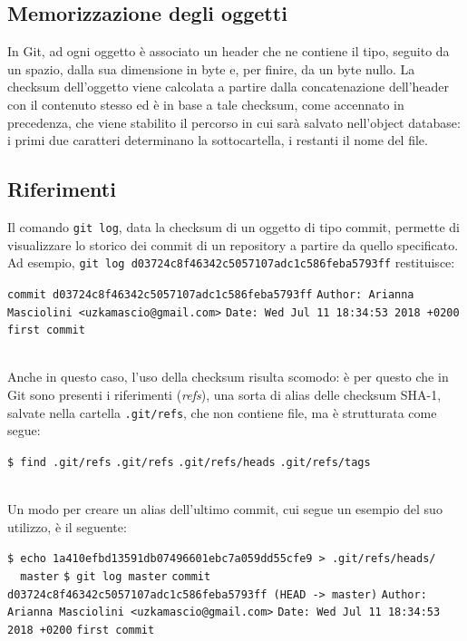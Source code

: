 \documentclass[12pt]{article}
\def\code#1{\texttt{#1}}
\begin{document}
\subsection{Memorizzazione degli oggetti}
In Git, ad ogni oggetto è associato un header che ne contiene il tipo, seguito da un spazio, dalla sua dimensione in byte e, per finire, da un byte nullo. La checksum dell'oggetto viene calcolata a partire dalla concatenazione dell'header con il contenuto stesso ed è in base a tale checksum, come accennato in precedenza, che viene stabilito il percorso in cui sarà salvato nell'object database: i primi due caratteri determinano la sottocartella, i restanti il nome del file.
\subsection{Riferimenti}
Il comando \code{git log}, data la checksum di un oggetto di tipo commit, permette di visualizzare lo storico dei commit di un repository a partire da quello specificato. Ad esempio, \code{git log d03724c8f46342c5057107adc1c586feba5793ff} restituisce:
\begin{algorithm*}
	\begin{algorithmic}
		\State \code{commit d03724c8f46342c5057107adc1c586feba5793ff}
		\State \code{Author: Arianna Masciolini <uzkamascio@gmail.com>}
		\State \code{Date:   Wed Jul 11 18:34:53 2018 +0200}
		\State 
		\State \code{first commit}
	\end{algorithmic}
\end{algorithm*}
\ \\
Anche in questo caso, l'uso della checksum risulta scomodo: è per questo che in Git sono presenti i riferimenti (\textit{refs}), una sorta di alias delle checksum SHA-1, salvate nella cartella \code{.git/refs}, che non contiene file, ma è strutturata come segue:
\begin{algorithm*}
	\begin{algorithmic}
		\State \code{\$ find .git/refs}
		\State \code{.git/refs}
		\State \code{.git/refs/heads}
		\State \code{.git/refs/tags}
	\end{algorithmic}
\end{algorithm*}
\ \\Un modo per creare un alias dell'ultimo commit, cui segue un esempio del suo utilizzo, è il seguente:
\begin{algorithm*}
	\begin{algorithmic}
		\State \code{\$ echo 1a410efbd13591db07496601ebc7a059dd55cfe9 > .git/refs/heads/\\ \ \ master}
		\State \code{\$ git log master}
		\State \code{commit d03724c8f46342c5057107adc1c586feba5793ff (HEAD -> master)}
		\State \code{Author: Arianna Masciolini <uzkamascio@gmail.com>}
		\State \code{Date:   Wed Jul 11 18:34:53 2018 +0200}
		\State
		\State \code{first commit}
	\end{algorithmic}
\end{algorithm*}
\end{document}
